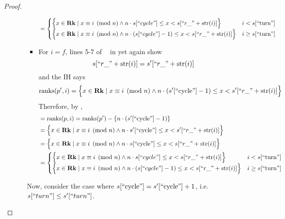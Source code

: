 \documentclass{amsart}
\DeclareMathOperator{\Rk}{\mathbf{Rk}}
\DeclareMathOperator{\zpostpop}{z_{\mathrm{post-pop}}}
\DeclareMathOperator{\ranks}{\mathrm{ranks}}
\theoremstyle{definition}
\begin{document}
\begin{proof}
\begin{enumerate}
\begin{enumerate}
\begin{itemize}
\begin{align*}
                                &=
                                    \begin{cases}
                                        \Big\{x \in \Rk \mid x \equiv i \pmod n \land n \cdot s[``cycle"] \leq x < s[``r\_" + \mathrm{str}(i)] \Big\} 
                                        & i < s[``\text{turn}"]\\
                                        \Big\{x \in \Rk \mid x \equiv i \pmod n \land n \cdot (s[``cycle"] - 1) \leq x < s[``r\_" + \mathrm{str}(i)]\Big\} 
                                        & i \geq s[``\text{turn}"]
                                    \end{cases}
                            \end{align*}

                        \item For $i = f$, lines 5-7 of $\zpostpop$ in  yet again show
                            $$s[``r\_" + \mathrm{str}(i)] = s^\prime[``r\_" + \mathrm{str}(i)]$$
                            and the IH says
                            $$
                                \ranks(p^\prime, i) = 
                                \Big\{x \in \Rk \mid x \equiv i \pmod n \land n \cdot (s^\prime[``\text{cycle}"] - 1) \leq x < s^\prime[``r\_" + \mathrm{str}(i)]\Big\} 
                            $$
                            Therefore, by ,
                            \begin{align*}
                                &= \ranks(p, i) = \ranks(p^\prime) - \{n \cdot (s^\prime[``\text{cycle}"] - 1)\}\\
                                &= \Big\{x \in \Rk \mid x \equiv i \pmod n \land n \cdot s^\prime[``\text{cycle}"] \leq x < s^\prime[``r\_" + \mathrm{str}(i)]\Big\}\\
                                &= \Big\{x \in \Rk \mid x \equiv i \pmod n \land n \cdot s[``\text{cycle}"] \leq x < s[``r\_" + \mathrm{str}(i)]\Big\}\\
                                &=
                                    \begin{cases}
                                        \Big\{x \in \Rk \mid x \equiv i \pmod n \land n \cdot s[``cycle"] \leq x < s[``r\_" + \mathrm{str}(i)] \Big\} 
                                        & i < s[``\text{turn}"]\\
                                        \Big\{x \in \Rk \mid x \equiv i \pmod n \land n \cdot (s[``cycle"] - 1) \leq x < s[``r\_" + \mathrm{str}(i)]\Big\} 
                                        & i \geq s[``\text{turn}"]
                                    \end{cases}
                            \end{align*}
                    \end{itemize}

                    Now, consider the case where $s[``\text{cycle}"] = s^\prime[``\text{cycle}"] + 1$, i.e. $s[``turn"] \leq s^\prime[``turn"]$.
            \end{enumerate}
    \end{enumerate}
\end{proof}
\end{document}
